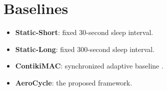\section{Baselines}
\begin{itemize}[leftmargin=1.4em]
  \item \textbf{Static-Short}: fixed 30-second sleep interval.
  \item \textbf{Static-Long}: fixed 300-second sleep interval.
  \item \textbf{ContikiMAC}: synchronized adaptive baseline \cite{ye2004smac}.
  \item \textbf{AeroCycle}: the proposed framework.
\end{itemize}
